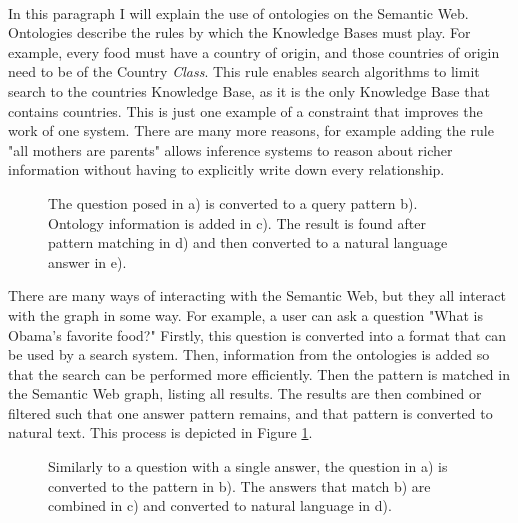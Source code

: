 \documentclass{article}
\begin{document}
 \paragraph{}
 In this paragraph I will explain the use of ontologies on the Semantic Web. Ontologies describe the rules by which the Knowledge Bases must play. For example, every food must have a country of origin, and those countries of origin need to be of the Country \emph{Class}. This rule enables search algorithms to limit search to the countries Knowledge Base, as it is the only Knowledge Base that contains countries\cite{whyontologies}. This is just one example of a constraint that improves the work of one system. There are many more reasons, for example adding the rule "all mothers are parents" allows inference systems to reason about richer information without having to explicitly write down every relationship.
 
 \begin{figure}[H]
 \centering
 \caption[Graph question example]{The question posed in a) is converted to a query pattern b). Ontology information is added in c). The result is found after pattern matching in d) and then converted to a natural language answer in e).}
 \label{question_graph}
 \end{figure}
 
 There are many ways of interacting with the Semantic Web, but they all interact with the graph in some way. For example, a user can ask a question "What is Obama's favorite food?" Firstly, this question is converted into a format that can be used by a search system. Then, information from the ontologies is added so that the search can be performed more efficiently. Then the pattern is matched in the Semantic Web graph, listing all results. The results are then combined or filtered such that one answer pattern remains, and that pattern is converted to natural text. This process is depicted in Figure \ref{question_graph}.

 \begin{figure}[H]
 \centering
 \caption[Graph biography example]{Similarly to a question with a single answer, the question in a) is converted to the pattern in b). The answers that match b) are combined in c) and converted to natural language in d).}
 \label{question_graph2}
 \end{figure}
 
\end{document}
